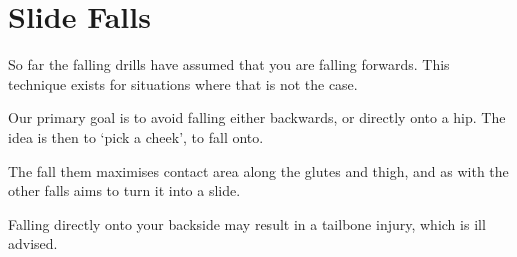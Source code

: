 \section{Slide Falls}
\label{sec:falls/slide}

So far the falling drills have assumed that you are falling forwards.
This technique exists for situations where that is not the case.

Our primary goal is to avoid falling either backwards, or directly onto a hip.  
The idea is then to `pick a cheek', to fall onto.  


The fall them maximises contact area along the glutes and thigh, and as with the other falls aims to turn it into a slide.

Falling directly onto your backside may result in a tailbone injury, which is ill advised.  
